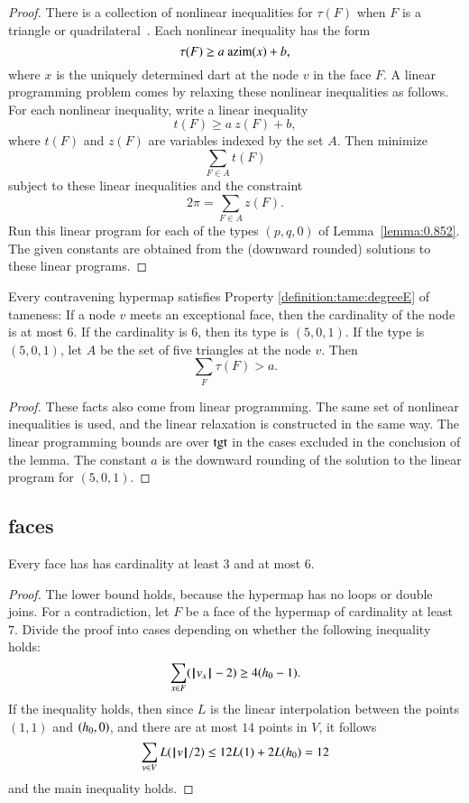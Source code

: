 {\begin{proof} There is a collection of nonlinear inequalities
for $\tau(F)$ when $F$ is a triangle or quadrilateral~\cite[FUSDSPJ]{hales:2009:nonlinear}. Each nonlinear inequality has the form
$$\tau(F) \ge a~{\operatorname{azim}}(x) + b,$$
where $x$ is the uniquely determined dart at the node $v$ in the face $F$.  A linear programming problem comes by relaxing these nonlinear inequalities as follows.  For each nonlinear inequality,  write a linear inequality
$$
t(F) \ge a~z(F) + b,
$$
where $t(F)$ and $z(F)$ are variables indexed by the set $A$.
Then  minimize 
$$\sum_{F\in A} t(F)$$
subject to these linear inequalities and the constraint
$$
2\pi = \sum_{F\in A} z(F).
$$
Run this linear program for each of the types $(p,q,0)$ of Lemma~\ref{lemma:0.852}. The given constants are obtained from the (downward rounded) solutions to these linear programs.
\end{proof}

\begin{lemma}\label{lemma:deg5}
Every contravening hypermap satisfies Property
\ref{definition:tame:degreeE} of tameness: If a node $v$ meets an
exceptional face, then the cardinality of the node is at most $6$.
If the cardinality is $6$, then its type is $(5,0,1)$.
If the type is $(5,0,1)$, let $A$ be the set of five triangles at the
node $v$.  Then
$$
\sum_F \tau(F) > a.
$$
\end{lemma}

\begin{proof} These facts also come from linear programming.
The same set of nonlinear inequalities is used, and the linear
relaxation is constructed in the same way.  The linear programming
bounds are over ${\operatorname{tgt}}$ in the cases excluded in the conclusion
of the lemma.  The constant $a$ is the downward rounding of the solution to the linear program for $(5,0,1)$.
\end{proof}

\subsection{faces}



\begin{lemma}  
Every face has has cardinality at least $3$ and at most $6$.
\end{lemma}

\begin{proof} The lower bound holds, because the hypermap has no loops or double joins.  For a contradiction, let $F$ be a face of the hypermap of cardinality at least $7$.  Divide the proof into cases depending on whether the
following inequality holds:
$$
\sum _{x\in F} ({{\hskip0.1em|\hskip-0.15em|\hskip0.1em}v_x{\hskip0.1em|\hskip-0.15em|\hskip0.1em}}-2) \ge 4({h_0}-1).
$$
If the inequality holds, then since $L$ is the linear interpolation between the points $(1,1)$ and $({h_0},0)$, and there are at most $14$ points in $V$, it follows
$$\sum_{v\in V}L({{\hskip0.1em|\hskip-0.15em|\hskip0.1em}v{\hskip0.1em|\hskip-0.15em|\hskip0.1em}}/2) \le 12 L(1) + 2 L({h_0}) =12$$
and the main inequality holds.


\end{proof}}
